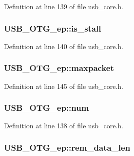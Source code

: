 Definition at line 139 of file usb\-\_\-core.\-h.

\hypertarget{struct_u_s_b___o_t_g__ep_a361738459c6c935bad498f62a8c87346}{
\subsubsection[{is\-\_\-stall}]{ U\-S\-B\-\_\-\-O\-T\-G\-\_\-ep\-::is\-\_\-stall}}\label{struct_u_s_b___o_t_g__ep_a361738459c6c935bad498f62a8c87346}


Definition at line 140 of file usb\-\_\-core.\-h.

\hypertarget{struct_u_s_b___o_t_g__ep_a212a39c3f28c474e617f49b7a81206d7}{
\subsubsection[{maxpacket}]{ U\-S\-B\-\_\-\-O\-T\-G\-\_\-ep\-::maxpacket}}\label{struct_u_s_b___o_t_g__ep_a212a39c3f28c474e617f49b7a81206d7}


Definition at line 145 of file usb\-\_\-core.\-h.

\hypertarget{struct_u_s_b___o_t_g__ep_ae9b1ada461084c72b59776a4c22cbf44}{
\subsubsection[{num}]{ U\-S\-B\-\_\-\-O\-T\-G\-\_\-ep\-::num}}\label{struct_u_s_b___o_t_g__ep_ae9b1ada461084c72b59776a4c22cbf44}


Definition at line 138 of file usb\-\_\-core.\-h.

\hypertarget{struct_u_s_b___o_t_g__ep_a30b0601d0ad17930b859f6c078d1ff46}{
\subsubsection[{rem\-\_\-data\-\_\-len}]{ U\-S\-B\-\_\-\-O\-T\-G\-\_\-ep\-::rem\-\_\-data\-\_\-len}}\label{struct_u_s_b___o_t_g__ep_a30b0601d0ad17930b859f6c078d1ff46}


